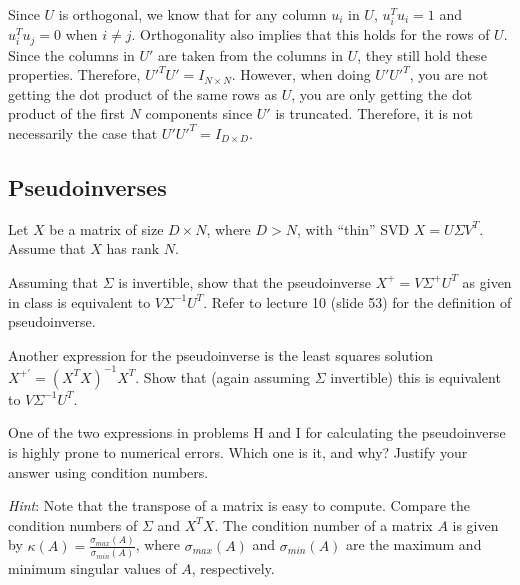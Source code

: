 \begin{solution}
	Since $U$ is orthogonal, we know that for any column $u_i$ in $U$, $u_{i}^{T}u_{i} = 1$ and $u_{i}^{T}u_{j} = 0$ when $i \neq j$. Orthogonality also implies that this holds for the rows of $U$. Since the columns in $U'$ are taken from the columns in $U$, they still hold these properties. Therefore, $U'^TU' = I_{N \times N}$. However, when doing $U'U'^T$, you are not getting the dot product of the same rows as $U$, you are only getting the dot product of the first $N$ components since $U'$ is truncated. Therefore, it is not necessarily the case that $U'U'^T = I_{D \times D}$. 
\end{solution}

\newpage
\subsection{Pseudoinverses} Let $X$ be a matrix of size $D \times N$, where $D > N$, with ``thin'' SVD $X = U\Sigma V^T$. Assume that $X$ has rank $N$.

\problem[4] Assuming that $\Sigma$ is invertible, show that the pseudoinverse $X^+ = V\Sigma^+ U^T$ as given in class is equivalent to $V\Sigma^{-1} U^T$. Refer to lecture 10 (slide 53) for the definition of pseudoinverse.

\begin{solution}
\end{solution}

\problem[4] Another expression for the pseudoinverse is the least squares solution $X^{+'} = (X^T X)^{-1}X^T$. Show that (again assuming $\Sigma$ invertible) this is equivalent to $V\Sigma^{-1}U^T$.
\begin{solution}
\end{solution}

\problem[2] One of the two expressions in problems H and I for calculating the pseudoinverse is highly prone to numerical errors. Which one is it, and why? Justify your answer using condition numbers.

\textit{Hint}: Note that the transpose of a matrix is easy to compute. Compare the condition numbers of $\Sigma$ and $X^T X$. The condition number of a matrix $A$ is given by $\kappa(A) = \frac{\sigma_{max}(A)}{\sigma_{min}(A)}$, where $\sigma_{max}(A)$ and $\sigma_{min}(A)$ are the maximum and minimum singular values of $A$, respectively.

\begin{solution}

\end{solution}

